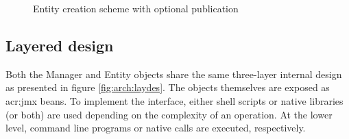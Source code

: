 \documentclass[11pt,openany]{book}
\begin{document}
          \begin{figure}[H]

            \centering


            \caption{Entity creation scheme with optional publication}
            \label{fig:arch:pub}
          
          \end{figure}


      \subsection{Layered design}

        Both the Manager and Entity objects share the same three-layer internal design as presented in figure
        \ref{fig:arch:laydes}. The objects themselves are exposed as \gls{acr:jmx} beans. To implement the interface,
        either shell scripts or native libraries (or both) are used depending on the complexity of an operation. At the
        lower level, command line programs or native calls are executed, respectively.
\end{document}
